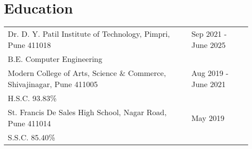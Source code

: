 \documentclass[a4paper,10pt]{article}
\makeatletter
\newenvironment{jobshort}[2]
    {
    \begin{tabularx}{\linewidth}{@{}l X r@{}}
    \textbf{#1} & \hfill &  #2 \\[3.75pt]
    \end{tabularx}
    }
    {
    }
\newenvironment{joblong}[2]
    {
    \begin{tabularx}{\linewidth}{@{}l X r@{}}
    \textbf{#1} & \hfill &  #2 \\[3.75pt]
    \end{tabularx}
    \begin{minipage}[t]{\linewidth}
    \begin{itemize}[nosep,after=\strut, leftmargin=1em, itemsep=3pt,label=--]
    }
    {
    \end{itemize}
    \end{minipage}    
    }
\makeatother
\begin{document}
\section{Education}
\begin{tabularx}{\linewidth}{@{}l X@{}}	

Dr. D. Y. Patil Institute of Technology, Pimpri, Pune 411018 & \hfill 
Sep 2021 - June 2025 \\ \vspace*{2mm}
B.E. Computer Engineering \\ 

Modern College of Arts, Science \& Commerce, Shivajinagar, Pune 411005 & \hfill 
Aug 2019 - June 2021 \\ \vspace*{2mm}
H.S.C. 93.83\% \\ 

St. Francis De Sales High School, Nagar Road, Pune 411014 & \hfill 
May 2019 \\ 
S.S.C. 85.40\% \\

\end{tabularx}




  
\end{document}
